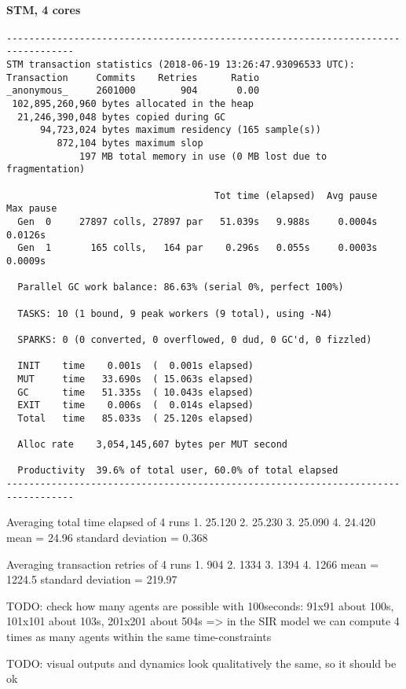 \paragraph{STM, 4 cores}
\begin{verbatim}
----------------------------------------------------------------------------------
STM transaction statistics (2018-06-19 13:26:47.93096533 UTC):
Transaction     Commits    Retries      Ratio
_anonymous_     2601000        904       0.00
 102,895,260,960 bytes allocated in the heap
  21,246,390,048 bytes copied during GC
      94,723,024 bytes maximum residency (165 sample(s))
         872,104 bytes maximum slop
             197 MB total memory in use (0 MB lost due to fragmentation)

                                     Tot time (elapsed)  Avg pause  Max pause
  Gen  0     27897 colls, 27897 par   51.039s   9.988s     0.0004s    0.0126s
  Gen  1       165 colls,   164 par    0.296s   0.055s     0.0003s    0.0009s

  Parallel GC work balance: 86.63% (serial 0%, perfect 100%)

  TASKS: 10 (1 bound, 9 peak workers (9 total), using -N4)

  SPARKS: 0 (0 converted, 0 overflowed, 0 dud, 0 GC'd, 0 fizzled)

  INIT    time    0.001s  (  0.001s elapsed)
  MUT     time   33.690s  ( 15.063s elapsed)
  GC      time   51.335s  ( 10.043s elapsed)
  EXIT    time    0.006s  (  0.014s elapsed)
  Total   time   85.033s  ( 25.120s elapsed)

  Alloc rate    3,054,145,607 bytes per MUT second

  Productivity  39.6% of total user, 60.0% of total elapsed
----------------------------------------------------------------------------------
\end{verbatim}
  
Averaging total time elapsed of 4 runs 
1. 25.120
2. 25.230
3. 25.090
4. 24.420
mean = 24.96
standard deviation = 0.368

Averaging transaction retries of 4 runs
1. 904
2. 1334
3. 1394
4. 1266
mean = 1224.5
standard deviation = 219.97

TODO: check how many agents are possible with 100seconds: 91x91 about 100s, 101x101 about 103s, 201x201 about 504s => in the SIR model we can compute 4 times as many agents within the same time-constraints

TODO: visual outputs and dynamics look qualitatively the same, so it should be ok

